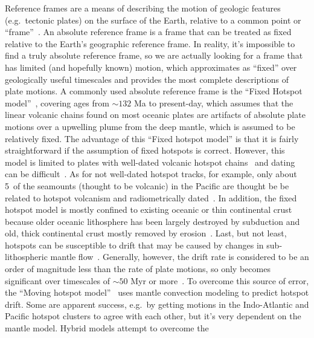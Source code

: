 Reference frames are a means of describing the motion of geologic features
(e.g.\ tectonic plates) on the surface of the Earth, relative to a common point
or ``frame''~\citep{Sh12}. An absolute reference frame is a frame that can be
treated as fixed relative to the Earth's geographic reference frame. In reality,
it's impossible to find a truly absolute reference frame, so we are actually
looking for a frame that has limited (and hopefully known) motion, which
approximates as ``fixed'' over geologically useful timescales and provides the
most complete descriptions of plate motions. A commonly used absolute reference
frame is the ``Fixed Hotspot model''~\citep{M93,M99}, covering ages from
${\sim}132$ Ma to present-day, which assumes that the linear volcanic chains
found on most oceanic plates are artifacts of absolute plate motions over a
upwelling plume from the deep mantle, which is assumed to be relatively fixed.
The advantage of this ``Fixed hotspot model'' is that it is fairly
straightforward if the assumption of fixed hotspots is correct. However, this
model is limited to plates with well-dated volcanic hotspot chains~\citep[e.g.\
the Ninetyeast Ridge on the Indian Ocean floor and the Walvis Ridge in the
southern Atlantic Ocean; see][]{O05} and dating can be difficult~\citep[e.g.\
diffuse volcanic centers possibly related to large diameter plume conduits could
cause the existence of time reversals; see][]{O05}. As for not well-dated
hotspot tracks, for example, only about 5\textperthousand\ of the seamounts
(thought to be volcanic) in the Pacific are thought be be related to hotspot
volcanism and radiometrically dated~\citep[39 per cent of these ages are less
than 10 Ma; see][]{H07}. In addition, the fixed hotspot model is mostly confined
to existing oceanic or thin continental crust because older oceanic lithosphere
has been largely destroyed by subduction and old, thick continental crust mostly
removed by erosion~\citep{C13}. Last, but not least, hotspots can be susceptible
to drift that may be caused by changes in sub-lithospheric mantle flow~\citep{T09}.
Generally, however, the drift rate is considered to be an order of magnitude
less than the rate of plate motions, so only becomes significant over timescales
of ${\sim}50$ Myr or more~\citep{O05,T07}. To overcome this source of error, the
``Moving hotspot model''~\citep{O05} uses mantle convection modeling to predict
hotspot drift. Some are apparent success, e.g.\ by getting motions in the
Indo-Atlantic and Pacific hotspot clusters to agree with each other, but it's
very dependent on the mantle model. Hybrid models attempt to overcome the
